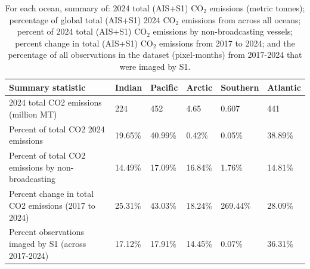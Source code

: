 \begin{table}[!h]
\centering
\caption{\label{tab:emissions_by_ocean_summary_tbl}For each ocean, summary of: 2024 total (AIS+S1) CO$_2$ emissions (metric tonnes); percentage of global total (AIS+S1) 2024 CO$_2$ emissions from across all oceans; percent of 2024 total (AIS+S1) CO$_2$ emissions by non-broadcasting vessels; percent change in total (AIS+S1) CO$_2$ emissions from 2017 to 2024; and the percentage of all observations in the dataset (pixel-months) from 2017-2024 that were imaged by S1.}
\centering
\begin{tabular}[t]{l|l|l|l|l|l}
\hline
Summary statistic & Indian & Pacific & Arctic & Southern & Atlantic\\
\hline
2024 total CO2 emissions (million MT) & 224 & 452 & 4.65 & 0.607 & 441\\
\hline
Percent of total CO2 2024 emissions & 19.65\% & 40.99\% & 0.42\% & 0.05\% & 38.89\%\\
\hline
Percent of total CO2 emissions by non-broadcasting & 14.49\% & 17.09\% & 16.84\% & 1.76\% & 14.81\%\\
\hline
Percent change in total CO2 emissions (2017 to 2024) & 25.31\% & 43.03\% & 18.24\% & 269.44\% & 28.09\%\\
\hline
Percent observations imaged by S1 (across 2017-2024) & 17.12\% & 17.91\% & 14.45\% & 0.07\% & 36.31\%\\
\hline
\end{tabular}
\end{table}
